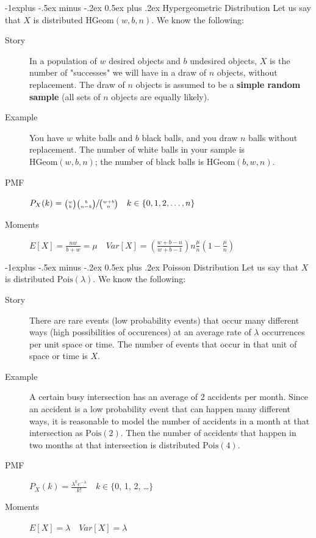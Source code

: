 \documentclass[10pt,landscape]{article}
\makeatletter
\newcommand{\Pois}{\textrm{Pois}}
\newcommand{\Hypergeometric}{\textrm{HGeom}}
\newcommand{\HGeom}{\textrm{HGeom}}
\renewcommand{\subsection}{\@startsection{subsection}{2}{0mm}%
                                {-1explus -.5ex minus -.2ex}%
                                {0.5ex plus .2ex}%
                                {\normalfont\normalsize\bfseries}}
\makeatother
\begin{document}
\begin{multicols*}{3}
    \subsection{Hypergeometric Distribution} Let us say that $X$ is distributed $\Hypergeometric(w, b, n)$. We know the following:
    \begin{description}
        \item[Story] In a population of $w$ desired objects and  $b$ undesired objects, $X$ is the number of "successes" we will have in a draw of $n$ objects, without replacement. The draw of $n$ objects is assumed to be a \textbf{simple random sample} (all sets of $n$ objects are equally likely).
        \item[Example] You have $w$ white balls and $b$ black balls, and you draw $n$ balls without replacement. The number of white balls in your sample is $\HGeom(w,b,n)$; the number of black balls is $\HGeom(b,w,n)$. \item[PMF] $P_X(k) = \sfrac{{w \choose k}{b \choose n-k}}{{w + b \choose n}} \quad k \in \{0, 1, 2, \dots,  n\}$
        \item[Moments] $E[X] = \frac{nw}{b+w} = \mu \quad Var[X] = \left(\frac{w+b-n}{w+b-1} \right) n\frac{\mu}{n}(1 - \frac{\mu}{n})$
    \end{description}
                                    
    \subsection{Poisson Distribution} Let us say that $X$ is distributed $\Pois(\lambda)$. We know the following:
    \begin{description}
        \item[Story] There are rare events (low probability events) that occur many different ways (high possibilities of occurences) at an average rate of $\lambda$ occurrences per unit space or time. The number of events that occur in that unit of space or time is $X$.
                                                    
        \item[Example] A certain busy intersection has an average of 2 accidents per month. Since an accident is a low probability event that can happen many different ways, it is reasonable to model the number of accidents in a month at that intersection as $\Pois(2)$. Then the number of accidents that happen in two months at that intersection is distributed $\Pois(4)$.
        \item[PMF] $P_X(k) = \frac{\lambda^ke^{-\lambda}}{k!} \quad k \in \{$0, 1, 2, \dots $\}$ 
        \item[Moments] $E[X] = \lambda \quad Var[X] = \lambda$
                                                    

\end{description}
\end{multicols*}
\end{document}
